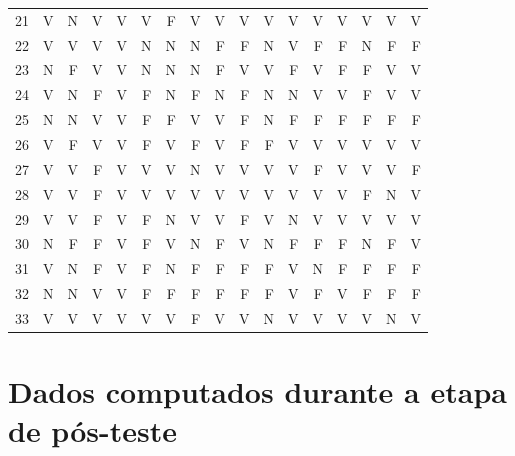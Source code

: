 \begin{apendicesenv}
\begin{center}
\begin{tabular}{ l r r r r r r r r r r r r r r r r}
	21	&	V	&	N	&	V	&	V	&	V	&	F	&	V	&	V	&	V	&	V	&	V	&	V	&	V	&	V	&	V	&	V	\\
	22	&	V	&	V	&	V	&	V	&	N	&	N	&	N	&	F	&	F	&	N	&	V	&	F	&	F	&	N	&	F	&	F	\\
	23	&	N	&	F	&	V	&	V	&	N	&	N	&	N	&	F	&	V	&	V	&	F	&	V	&	F	&	F	&	V	&	V	\\
	24	&	V	&	N	&	F	&	V	&	F	&	N	&	F	&	N	&	F	&	N	&	N	&	V	&	V	&	F	&	V	&	V	\\
	25	&	N	&	N	&	V	&	V	&	F	&	F	&	V	&	V	&	F	&	N	&	F	&	F	&	F	&	F	&	F	&	F	\\
	26	&	V	&	F	&	V	&	V	&	F	&	V	&	F	&	V	&	F	&	F	&	V	&	V	&	V	&	V	&	V	&	V	\\
	27	&	V	&	V	&	F	&	V	&	V	&	V	&	N	&	V	&	V	&	V	&	V	&	F	&	V	&	V	&	V	&	F	\\
	28	&	V	&	V	&	F	&	V	&	V	&	V	&	V	&	V	&	V	&	V	&	V	&	V	&	V	&	F	&	N	&	V	\\
	29	&	V	&	V	&	F	&	V	&	F	&	N	&	V	&	V	&	F	&	V	&	N	&	V	&	V	&	V	&	V	&	V	\\
	30	&	N	&	F	&	F	&	V	&	F	&	V	&	N	&	F	&	V	&	N	&	F	&	F	&	F	&	N	&	F	&	V	\\
	31	&	V	&	N	&	F	&	V	&	F	&	N	&	F	&	F	&	F	&	F	&	V	&	N	&	F	&	F	&	F	&	F	\\
	32	&	N	&	N	&	V	&	V	&	F	&	F	&	F	&	F	&	F	&	F	&	V	&	F	&	V	&	F	&	F	&	F	\\
	33	&	V	&	V	&	V	&	V	&	V	&	V	&	F	&	V	&	V	&	N	&	V	&	V	&	V	&	V	&	N	&	V	\\
	
	\hline
	\bottomrule
	\end{tabular}
\end{center}


\chapter{Dados computados durante a etapa de pós-teste}\label{chap:resul2}


\end{apendicesenv}
